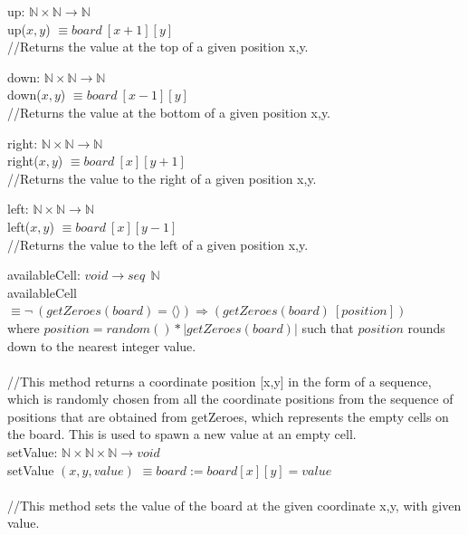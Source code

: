 \documentclass[12pt]{article}
\begin{document}
\medskip

\noindent up: $\mathbb{N} \times \mathbb{N} \rightarrow \mathbb{N}$
\\ \noindent up($x, y$) $\equiv board\:[x+1][y]$\\
\medskip
//Returns the value at the top of a given position x,y.

\bigskip

\noindent down: $\mathbb{N} \times \mathbb{N} \rightarrow \mathbb{N}$
\\ \noindent down($x, y$) $\equiv board\:[x-1][y]$\\
\medskip
//Returns the value at the bottom of a given position x,y.

\bigskip

\noindent right: $\mathbb{N} \times \mathbb{N} \rightarrow \mathbb{N}$
\\ \noindent right($x, y$) $\equiv board\:[x][y+1]$\\
\medskip
//Returns the value to the right of a given position x,y.

\bigskip

\noindent left: $\mathbb{N} \times \mathbb{N} \rightarrow \mathbb{N}$
\\ \noindent left($x, y$) $\equiv board\:[x][y-1]$ \\
\medskip
//Returns the value to the left of a given position x,y.

\bigskip

\noindent availableCell: $void \rightarrow \textit{seq} \: \: \mathbb{N}$
\\availableCell $\equiv \neg \: (getZeroes(board) = \langle \rangle) \Rightarrow  (getZeroes(board) \: [position])$
\noindent \\where
$position = random() * |getZeroes(board)|$ such that $position$ rounds down to the nearest integer value.\\
\\//This method returns a coordinate position [x,y] in the form of a sequence, which is randomly chosen from all the coordinate positions from the sequence of positions that are obtained from getZeroes, which represents the empty cells on the board. This is used to spawn a new value at an empty cell.\\

\noindent setValue: $\mathbb{N} \times \mathbb{N} \times \mathbb{N}  \rightarrow void$
\\setValue $(x,y,value)$ $\equiv board := board[x][y] = value$\\
\medskip
\\//This method sets the value of the board at the given coordinate x,y, with given value.\\
\end{document}
